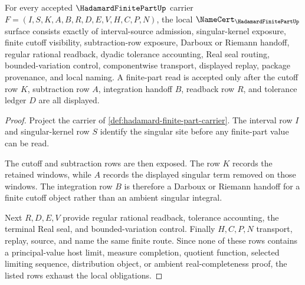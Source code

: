 \begin{theorem}
\label{thm:hadamard-finite-part-namecert-obligations}
For every accepted $\HadamardFinitePartUp$ carrier $F=(I,S,K,A,B,R,D,E,V,H,C,P,N)$, the local $\NameCert_{\HadamardFinitePartUp}$ surface consists exactly of interval-source admission, singular-kernel exposure, finite cutoff visibility, subtraction-row exposure, Darboux or Riemann handoff, regular rational readback, dyadic tolerance accounting, Real seal routing, bounded-variation control, componentwise transport, displayed replay, package provenance, and local naming. A finite-part read is accepted only after the cutoff row $K$, subtraction row $A$, integration handoff $B$, readback row $R$, and tolerance ledger $D$ are all displayed.
\end{theorem}
\begin{proof}
Project the carrier of \autoref{def:hadamard-finite-part-carrier}. The interval row $I$ and singular-kernel row $S$ identify the singular site before any finite-part value can be read.

The cutoff and subtraction rows are then exposed. The row $K$ records the retained windows, while $A$ records the displayed singular term removed on those windows. The integration row $B$ is therefore a Darboux or Riemann handoff for a finite cutoff object rather than an ambient singular integral.

Next $R,D,E,V$ provide regular rational readback, tolerance accounting, the terminal Real seal, and bounded-variation control. Finally $H,C,P,N$ transport, replay, source, and name the same finite route. Since none of these rows contains a principal-value host limit, measure completion, quotient function, selected limiting sequence, distribution object, or ambient real-completeness proof, the listed rows exhaust the local obligations.
\end{proof}

